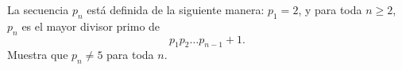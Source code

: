 La secuencia $p_n$ está definida de la siguiente manera: $p_1=2$, y para toda $n\ge 2$, $p_n$ es el mayor divisor primo de 
\[p_1p_2\dots p_{n-1}+1.\]
Muestra que $p_n\neq 5$ para toda $n$.